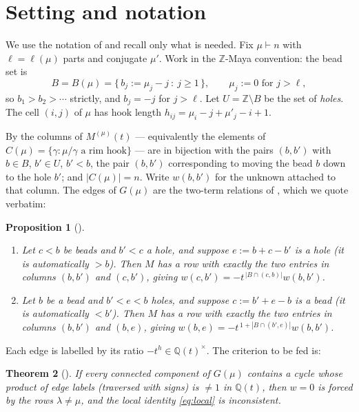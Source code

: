 \documentclass[11pt]{article}
\newtheorem{theorem}{Theorem}[section]
\newtheorem{proposition}[theorem]{Proposition}
\theoremstyle{definition}
\newcommand{\Q}{\mathbb{Q}}
\newcommand{\Z}{\mathbb{Z}}
\begin{document}
\section{Setting and notation}

We use the notation of \cite{Q140} and recall only what is needed. Fix $\mu\vdash n$ with
$\ell=\ell(\mu)$ parts and conjugate $\mu'$. Work in the $\Z$-Maya convention: the bead set is
\[
   B=B(\mu)=\{\,b_j:=\mu_j-j\ :\ j\ge1\,\},\qquad \mu_j:=0 \text{ for } j>\ell,
\]
so $b_1>b_2>\cdots$ strictly, and $b_j=-j$ for $j>\ell$. Let $U=\Z\setminus B$ be the set of
\emph{holes}. The cell $(i,j)$ of $\mu$ has hook length
$h_{ij}=\mu_i-j+\mu'_j-i+1$.

By \cite[Prop.~2.1]{Q140} the columns of $M^{(\mu)}(t)$ --- equivalently the elements of
$C(\mu)=\{\gamma:\mu/\gamma \text{ a rim hook}\}$ --- are in bijection with the pairs
$(b,b')$ with $b\in B$, $b'\in U$, $b'<b$, the pair $(b,b')$ corresponding to moving the bead
$b$ down to the hole $b'$; and $|C(\mu)|=n$. Write $w(b,b')$ for the unknown attached to that
column. The edges of $G(\mu)$ are the two-term relations of \cite[Prop.~6.2]{Q140}, which we
quote verbatim:

\begin{proposition}[{\cite[Prop.~6.2]{Q140}}]\label{prop:reflect}
\begin{enumerate}
\item[\textup{(I)}] Let $c<b$ be beads and $b'<c$ a hole, and suppose $e:=b+c-b'$ is a hole
(it is automatically $>b$). Then $M$ has a row with exactly the two entries in columns
$(b,b')$ and $(c,b')$, giving $w(c,b')=-t^{\,|B\cap(c,b)|}w(b,b')$.
\item[\textup{(II)}] Let $b$ be a bead and $b'<e<b$ holes, and suppose $c:=b'+e-b$ is a bead
(it is automatically $<b'$). Then $M$ has a row with exactly the two entries in columns
$(b,b')$ and $(b,e)$, giving $w(b,e)=-t^{\,1+|B\cap(b',e)|}w(b,b')$.
\end{enumerate}
\end{proposition}

Each edge is labelled by its ratio $-t^{h}\in\Q(t)^\times$. The criterion to be fed is:

\begin{theorem}[{\cite[Thm.~6.3]{Q140}}]\label{thm:graph}
If every connected component of $G(\mu)$ contains a cycle whose product of edge labels
(traversed with signs) is $\ne1$ in $\Q(t)$, then $w=0$ is forced by the rows $\lambda\ne\mu$,
and the local identity \eqref{eq:local} is inconsistent.
\end{theorem}
\end{document}
